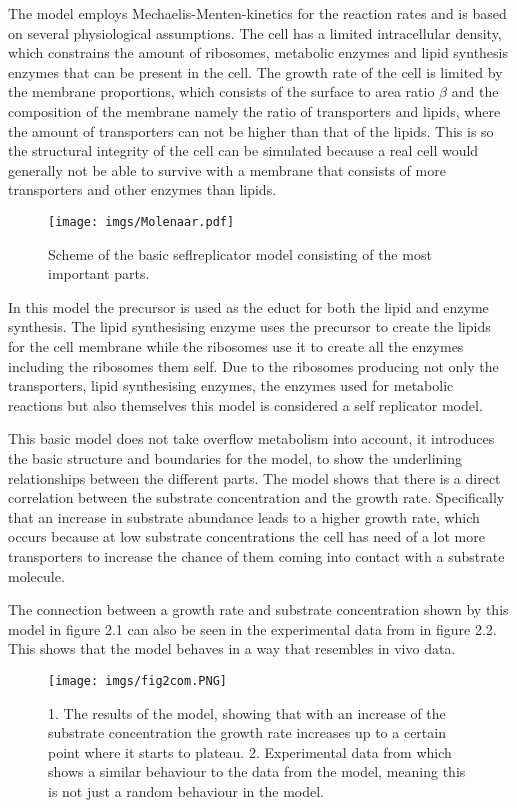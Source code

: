 The model employs Mechaelis-Menten-kinetics for the reaction rates and is based on several physiological assumptions. The cell has a limited intracellular density, which constrains the amount of ribosomes, metabolic enzymes and lipid synthesis enzymes that can be present in the cell. The growth rate of the cell is limited by the membrane proportions, which consists of the surface to area ratio $\beta$ and the composition of the membrane namely the ratio of transporters and lipids, where the amount of transporters can not be higher than that of the lipids. This is so the structural integrity of the cell can be simulated because a real cell would generally not be able to survive with a membrane that consists of more transporters and other enzymes than lipids. 

\begin{figure}[H]
    \centering
    \texttt{[image: imgs/Molenaar.pdf]}
    \caption{Scheme of the basic seflreplicator model consisting of the most important parts.}
    \label{fig:Molenaar}
\end{figure}

In this model the precursor is used as the educt for both the lipid and enzyme synthesis. The lipid synthesising enzyme uses the precursor to create the lipids for the cell membrane while the ribosomes use it to create all the enzymes including the ribosomes them self. Due to the ribosomes producing not only the transporters, lipid synthesising enzymes, the enzymes used for metabolic reactions but also themselves this model is considered a self replicator model. 

This basic model does not take overflow metabolism into account, it introduces the basic structure and boundaries for the model, to show the underlining relationships between the different parts. The model shows that there is a direct correlation between the substrate concentration and the growth rate. Specifically that an increase in substrate abundance leads to a higher growth rate, which occurs because at low substrate concentrations the cell has need of a lot more transporters to increase the chance of them coming into contact with a substrate molecule. 

The connection between a growth rate and substrate concentration shown by this model in figure 2.1 can also be seen in the experimental data from \cite{schulze1964} in figure 2.2. This shows that the model behaves in a way that resembles in vivo data.

\begin{figure}[H]
    \centering
    \texttt{[image: imgs/fig2com.PNG]}
    \caption{1. The results of the model, showing that with an increase of the substrate concentration the growth rate increases up to a certain point where it starts to plateau. 2. Experimental data from \cite{schulze1964} which shows a similar behaviour to the data from the model, meaning this is not just a random behaviour in the model.}
    \label{fig:fig2com}
\end{figure}

